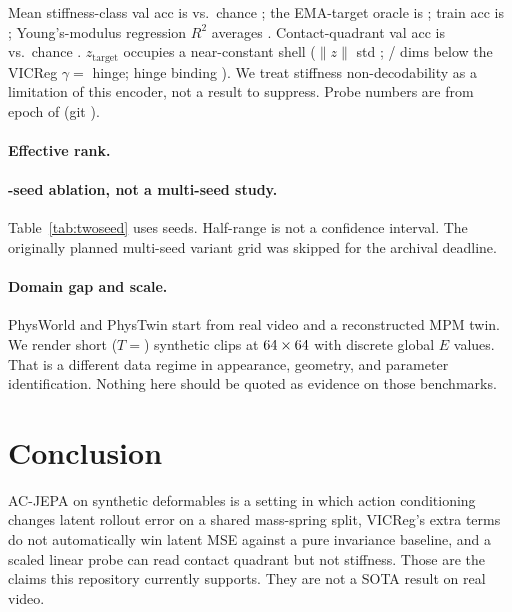 \documentclass{article}
\begin{document}
Mean stiffness-class val acc is \ProbeStiffValMean{} vs.\ chance
\ChanceStiffness{}; the EMA-target oracle is \ProbeStiffTargetMean{}; train acc
is \ProbeStiffTrainMean{}; Young's-modulus regression $R^2$ averages
\ProbeStiffValRTwo{}. Contact-quadrant val acc is \ProbeContactValMean{} vs.\
chance \ChanceContact{}. $z_{\mathrm{target}}$ occupies a near-constant shell
($\lVert z\rVert$ std \ZTNormStd{}; \ZTDimsBelowGamma{}/\ZTLatentDim{} dims below
the VICReg $\gamma{=}$\VicregGamma{} hinge; hinge binding \texttt{\ZTHingeBinding{}}). We treat
stiffness non-decodability as a limitation of this encoder, not a result to
suppress. Probe numbers are from epoch \VicregCompletedEpochs{} of
\WorkshopEpochs{} (git \texttt{\GitHead{}}).

\paragraph{Effective rank.}


\paragraph{\NSeeds{}-seed ablation, not a multi-seed study.}
Table~\ref{tab:twoseed} uses \NSeeds{} seeds. Half-range is not a confidence interval.
The originally planned multi-seed variant grid was skipped for the archival deadline.

\paragraph{Domain gap and scale.}
PhysWorld and PhysTwin start from real video and a reconstructed MPM twin. We
render \NEpisodes{} short ($T{=}$\EpisodeLength{}) synthetic clips at
$64\times64$ with \NStiffClasses{} discrete global $E$ values. That is a different
data regime in appearance, geometry, and parameter identification. Nothing here
should be quoted as evidence on those benchmarks.

\section{Conclusion}
AC-JEPA on synthetic deformables is a setting in which action conditioning
changes latent rollout error on a shared mass-spring split, VICReg's extra
terms do not automatically win latent MSE against a pure invariance baseline,
and a scaled linear probe can read contact quadrant but not stiffness. Those
are the claims this repository currently supports. They are not a SOTA result
on real video.



\end{document}
